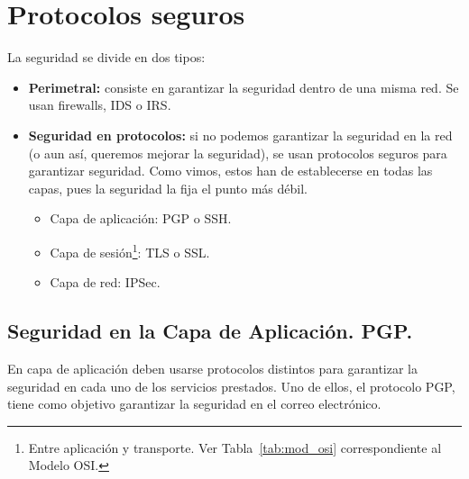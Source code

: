 \section{Protocolos seguros}
La seguridad se divide en dos tipos:
\begin{itemize}
    \item \textbf{Perimetral:} consiste en garantizar la seguridad dentro de una misma red. Se usan firewalls, \acrfull{IDS} o \acrfull{IRS}.
    
    \item \textbf{Seguridad en protocolos:} si no podemos garantizar la seguridad en la red (o aun así, queremos mejorar la seguridad), se usan protocolos seguros para garantizar seguridad. Como vimos, estos han de establecerse en todas las capas, pues la seguridad la fija el punto más débil.
    \begin{itemize}
        \item Capa de aplicación: \acrshort{PGP} o \acrshort{SSH}.
        \item Capa de sesión\footnote{Entre aplicación y transporte. Ver Tabla~\ref{tab:mod_osi} correspondiente al Modelo \acrshort{OSI}.}: \acrshort{TLS} o \acrshort{SSL}.
        \item Capa de red: \acrshort{IPSec}.
    \end{itemize}
\end{itemize}

\subsection{Seguridad en la Capa de Aplicación. \acrshort{PGP}.}

En capa de aplicación deben usarse protocolos distintos para garantizar la seguridad en cada uno de los servicios prestados. Uno de ellos, el protocolo \acrfull{PGP}, tiene como objetivo garantizar la seguridad en el correo electrónico.\\

